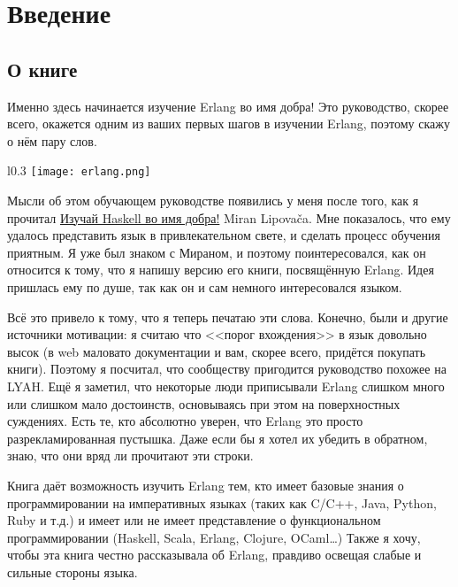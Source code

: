\chapter{Введение}\label{introduction}

\section{О книге}

Именно здесь начинается изучение Erlang во имя добра!
Это руководство, скорее всего, окажется одним из ваших первых шагов в изучении Erlang, поэтому скажу о нём пару слов.

\begin{wrapfigure}{l}{0.3\linewidth}
    \texttt{[image: erlang.png]}
\end{wrapfigure}

Мысли об этом обучающем руководстве появились у меня после того, как я прочитал \href{http://learnyouahaskell.com}{Изучай Haskell во имя добра!} Miran Lipova\v{c}a.
Мне показалось, что ему удалось представить язык в привлекательном свете, и сделать процесс обучения приятным.
Я уже был знаком с Мираном, и поэтому поинтересовался, как он относится к тому, что я напишу версию его книги, посвящённую Erlang.
Идея пришлась ему по душе, так как он и сам немного интересовался языком.

Всё это привело к тому, что я теперь печатаю эти слова.
Конечно, были и другие источники мотивации: я считаю что <<порог вхождения>> в язык довольно высок (в web маловато документации и вам, скорее всего, придётся покупать книги).
Поэтому я посчитал, что сообществу пригодится руководство похожее на LYAH.
Ещё я заметил, что некоторые люди приписывали Erlang слишком много или слишком мало достоинств, основываясь при этом на поверхностных суждениях.
Есть те, кто абсолютно уверен, что Erlang это просто разрекламированная пустышка.
Даже если бы я хотел их убедить в обратном, знаю, что они вряд ли прочитают эти строки.

Книга даёт возможность изучить Erlang тем, кто имеет базовые знания о программировании на императивных языках (таких как C/C++, Java, Python, Ruby и т.д.) и имеет или не имеет представление о функциональном программировании (Haskell, Scala, Erlang, Clojure, OCaml\ldots)
Также я хочу, чтобы эта книга честно рассказывала об Erlang, правдиво освещая слабые и сильные стороны языка.

